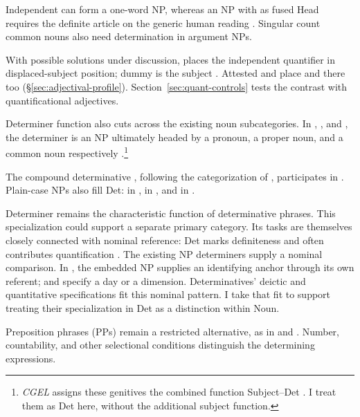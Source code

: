 \documentclass[12pt]{article}
\begin{document}
Independent  can form a one-word NP, whereas an NP with  as fused Head requires the definite article  on the generic human reading \citep[417--418]{huddleston2002}. Singular count common nouns also need determination in argument NPs.

With possible solutions under discussion,  places the independent quantifier in displaced-subject position; dummy  is the subject \citep[1391--1393]{huddleston2002}. Attested  and  place  and  there too (§\ref{sec:adjectival-profile}). Section~\ref{sec:quant-controls} tests the contrast with quantificational adjectives.

Determiner function also cuts across the existing noun subcategories. In , , and , the determiner is an NP ultimately headed by a pronoun, a proper noun, and a common noun respectively \citep[354--355, 470--471]{huddleston2002}.\footnote{\textit{CGEL} assigns these genitives the combined function Subject--Det \citep[472--473]{huddleston2002}. I treat them as Det here, without the additional subject function.}

The compound determinative , following the categorization of \textcite[§1.3]{Payne2007}, participates in . Plain-case NPs also fill Det:  in ,  in , and  in  \citep[355, 357]{huddleston2002}.

Determiner remains the characteristic function of determinative phrases. This specialization could support a separate primary category. Its tasks are themselves closely connected with nominal reference: Det marks definiteness and often contributes quantification \citep[354--359]{huddleston2002}. The existing NP determiners supply a nominal comparison. In , the embedded NP supplies an identifying anchor through its own referent;  and  specify a day or a dimension. Determinatives' deictic and quantitative specifications fit this nominal pattern. I take that fit to support treating their specialization in Det as a distinction within Noun.

Preposition phrases (PPs) remain a restricted alternative, as in  and  \citep[357, 433]{huddleston2002}. Number, countability, and other selectional conditions distinguish the determining expressions.
\end{document}
